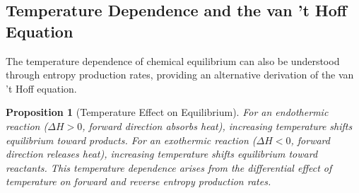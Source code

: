 \documentclass[12pt,a4paper]{article}
\newtheorem{proposition}[theorem]{Proposition}
\theoremstyle{definition}
\theoremstyle{remark}
\begin{document}
\subsection{Temperature Dependence and the van 't Hoff Equation}

The temperature dependence of chemical equilibrium can also be understood through entropy production rates, providing an alternative derivation of the van 't Hoff equation.

\begin{proposition}[Temperature Effect on Equilibrium]
\label{prop:temperature_effect}
For an endothermic reaction ($\Delta H > 0$, forward direction absorbs heat), increasing temperature shifts equilibrium toward products. For an exothermic reaction ($\Delta H < 0$, forward direction releases heat), increasing temperature shifts equilibrium toward reactants. This temperature dependence arises from the differential effect of temperature on forward and reverse entropy production rates.
\end{proposition}
\end{document}
